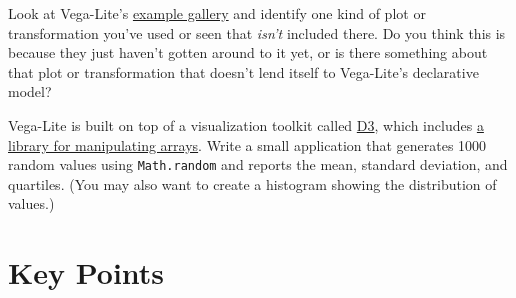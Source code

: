 Look at Vega-Lite's
\href{https://vega.github.io/vega-lite/examples/}{example gallery}
and identify one kind of plot or transformation you've used or seen
that \emph{isn't} included there.
Do you think this is because they just haven't gotten around to it yet,
or is there something about that plot or transformation
that doesn't lend itself to Vega-Lite's declarative model?


Vega-Lite is built on top of a visualization toolkit called \href{https://d3js.org/}{D3},
which includes \href{https://github.com/d3/d3-array}{a library for manipulating arrays}.
Write a small application that generates 1000 random values using \texttt{Math.random}
and reports the mean, standard deviation, and quartiles.
(You may also want to create a histogram showing the distribution of values.)

\section*{Key Points}



